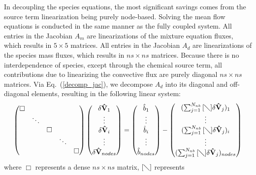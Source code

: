 In decoupling the species equations, the most significant savings comes from the
source term linearization being purely node-based\cite{gnoffo-tp}.  Solving the
mean flow equations is conducted in the same manner as the fully coupled system.
All entries in the Jacobian $A_m$ are linearizations of the mixture equation
fluxes, which results in $5\times5$ matrices. All entries in the Jacobian $A_d$
are linearizations of the species mass fluxes, which results in $ns \times ns$
matrices.  Because there is no interdependence of species, except through the
chemical source term, all contributions due to linearizing the convective flux
are purely diagonal $ns \times ns$ matrices.  Via Eq.~(\ref{decomp_jac}), we
decompose $A_d$ into its diagonal and off-diagonal elements, resulting in the
following linear system:
\begin{equation} \label{dc_sys} \begin{pmatrix} \Box &
    & & & \\ & \ddots & & & \\ & & \Box \\ & & & \ddots & \\ & & & & \Box
  \end{pmatrix} \begin{pmatrix} \delta \mathbf{\hat{V}}_1 \\ \vdots \\ \delta
    \mathbf{\hat{V}}_i \\ \vdots \\ \delta \mathbf{\hat{V}}_{nodes}
  \end{pmatrix} = \begin{pmatrix} \hat{b}_1 \\ \vdots \\ \hat{b}_i \\ \vdots \\
    \hat{b}_{nodes} \end{pmatrix} - \begin{pmatrix}
    (\sum_{j=1}^{N_{nb}}{[\diagdown] \delta\mathbf{\hat{V}}_{j}})_1 \\ \vdots \\
    (\sum_{j=1}^{N_{nb}}{[\diagdown] \delta\mathbf{\hat{V}}_{j}})_i \\ \vdots \\
    (\sum_{j=1}^{N_{nb}}{[\diagdown] \delta\mathbf{\hat{V}}_{j}})_{nodes}
  \end{pmatrix} 
\end{equation} 
where $\Box$ represents a dense $ns \times ns$ matrix, $[\diagdown]$ represents
